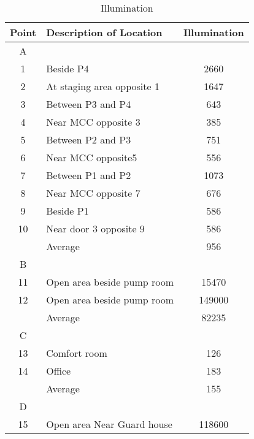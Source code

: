 \begin{table}
	\caption{Illumination}
	\label{ch047_tbl_illumination}
	{\footnotesize

\begin{tabular}{c|l|c}

\hline
Point & Description of Location & Illumination \\ 
\hline
A &  &  \\ 
1 & Beside P4 & 2660 \\ 
2 & At staging area opposite 1 & 1647 \\ 
3 & Between P3 and P4 & 643 \\ 
4 & Near MCC opposite 3 & 385 \\ 
5 & Between P2 and P3 & 751 \\ 
6 & Near MCC opposite5 & 556 \\ 
7 & Between P1 and P2 & 1073 \\ 
8 & Near MCC opposite 7 & 676 \\ 
9 & Beside P1 & 586 \\ 
10 & Near door 3 opposite 9 & 586 \\ 
 & Average & 956 \\ 
\hline
B &  &  \\ 
11 & Open area beside pump room & 15470 \\ 
12 & Open area beside pump room & 149000 \\ 
 & Average & 82235 \\ 
\hline
C &  &  \\ 
13 & Comfort room & 126 \\ 
14 & Office & 183 \\ 
 & Average & 155 \\ 
\hline
D &  &  \\ 
15 & Open area Near Guard house & 118600 \\ 
\hline

\end{tabular}
}
\end{table}